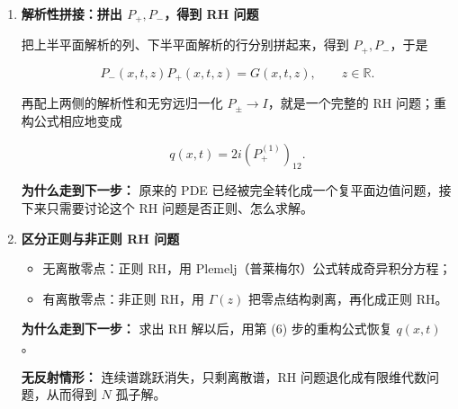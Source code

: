\documentclass[
    lang=cn,
    scheme=chinese,
    mode=simple,
    device=normal,
    color=blue,
    math=cm,
    thmcnt=section,
    12pt,
    nowatermark
]{elegantbook}
\begin{document}
\begin{enumerate}[(1)]
          把第 (3) 步写成全微分

          \[
              \mathrm{d}\!\left(e^{i\theta\widehat{\sigma}_3}\mu\right)
              =
              e^{i\theta\widehat{\sigma}_3}
              \left[(P\,\mathrm{d}x+Q\,\mathrm{d}t)\mu\right].
          \]

          沿 $x$ 从左右无穷远积分，得到两个特征函数 $\mu_1,\mu_2$（即两个 Volterra 积分方程）；它们作为同一个 Lax 对的基本矩阵解，彼此相差一个与 $x,t$ 无关的矩阵

          \[
              \psi_1=\psi_2S(z).
          \]

          $S(z)$ 就是谱矩阵（散射矩阵），它把初值 $q_0$ 编码成谱数据。

          \textbf{为什么走到下一步：}
          积分核里出现 $e^{\pm2iz(x-y)}$，它在上下半平面的衰减性直接决定 $\mu_1,\mu_2$ 各列、各行的解析区域。

    \item \textbf{解析性拼接：拼出 $P_+,P_-$，得到 RH 问题}

          把上半平面解析的列、下半平面解析的行分别拼起来，得到 $P_+,P_-$，于是

          \[
              P_-(x,t,z)P_+(x,t,z)=G(x,t,z),
              \qquad z\in\mathbb{R}.
          \]

          再配上两侧的解析性和无穷远归一化 $P_\pm\to I$，就是一个完整的 RH 问题；重构公式相应地变成

          \[
              q(x,t)=2i(P_+^{(1)})_{12}.
          \]

          \textbf{为什么走到下一步：}
          原来的 PDE 已经被完全转化成一个复平面边值问题，接下来只需要讨论这个 RH 问题是否正则、怎么求解。

    \item \textbf{区分正则与非正则 RH 问题}

          \begin{itemize}
              \item 无离散零点：正则 RH，用 Plemelj（普莱梅尔）公式转成奇异积分方程；
              \item 有离散零点：非正则 RH，用 $\Gamma(z)$ 把零点结构剥离，再化成正则 RH。
          \end{itemize}

          \textbf{为什么走到下一步：}
          求出 RH 解以后，用第 (6) 步的重构公式恢复 $q(x,t)$。

          \textbf{无反射情形：}
          连续谱跳跃消失，只剩离散谱，RH 问题退化成有限维代数问题，从而得到 $N$ 孤子解。

\end{enumerate}
\end{document}
